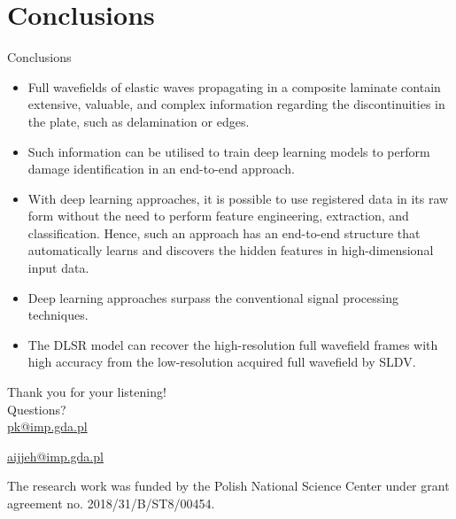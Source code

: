 \documentclass[10pt,aspectratio=169,dvipsnames]{beamer} %
\begin{document}
		\section{Conclusions}
		\begin{frame}{Conclusions}
			\footnotesize
			\begin{itemize}
				\item Full wavefields of elastic waves propagating in a composite laminate contain extensive, valuable, and complex information regarding the discontinuities in the plate, such as delamination or edges.
				\item Such information can be utilised to train deep learning models
				to perform damage identification in an end-to-end approach.
				\item With deep	learning approaches, it is possible to use registered data in its raw form without the need to perform feature engineering, extraction, and classification. 
				Hence, such an approach has an end-to-end structure that automatically learns and discovers the hidden features in high-dimensional input data.
				\item Deep learning approaches surpass the conventional signal processing techniques.
				\item The DLSR model can recover the high-resolution full wavefield
				frames with high accuracy from the low-resolution acquired full wavefield by SLDV.
			\end{itemize}
		\end{frame}		
		{
			\begin{frame}[standout]
				Thank you for your listening!\\ \vspace{12pt}
				Questions?\\ \vspace{12pt}
				\url{pk@imp.gda.pl} 
				\par\medskip
				\url{aijjeh@imp.gda.pl}
				
				
				\par\medskip
				\par\medskip
				\footnotesize
				The research work was funded by the Polish National Science Center under grant agreement no. 2018/31/B/ST8/00454.
			\end{frame}
		}
	
\end{document}

